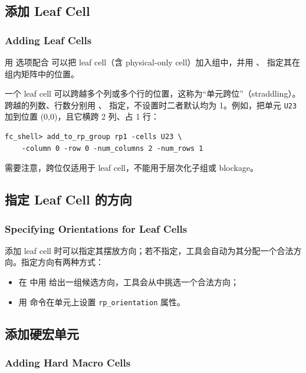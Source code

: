 \subsection{添加 Leaf Cell}
\subsubsection*{Adding Leaf Cells}

用  选项配合  可以把 leaf cell（含 physical-only cell）加入组中，并用 、 指定其在组内矩阵中的位置。

一个 leaf cell 可以跨越多个列或多个行的位置，这称为“单元跨位”（straddling）。跨越的列数、行数分别用 、 指定，不设置时二者默认均为 1。例如，把单元 \texttt{U23} 加到位置 (0,0)，且它横跨 2 列、占 1 行：
\begin{lstlisting}
fc_shell> add_to_rp_group rp1 -cells U23 \
    -column 0 -row 0 -num_columns 2 -num_rows 1
\end{lstlisting}

需要注意，跨位仅适用于 leaf cell，不能用于层次化子组或 blockage。

\subsection{指定 Leaf Cell 的方向}
\subsubsection*{Specifying Orientations for Leaf Cells}

添加 leaf cell 时可以指定其摆放方向；若不指定，工具会自动为其分配一个合法方向。指定方向有两种方式：
\begin{itemize}
  \item 在  中用  给出一组候选方向，工具会从中挑选一个合法方向；
  \item 用 \cmd{set\_attribute} 命令在单元上设置 \texttt{rp\_orientation} 属性。
\end{itemize}

\subsection{添加硬宏单元}
\subsubsection*{Adding Hard Macro Cells}

